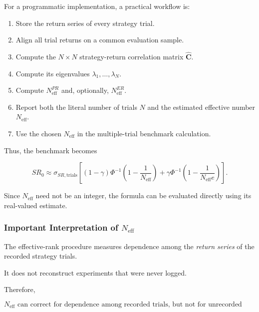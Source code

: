 \documentclass[11pt,a4paper]{article}
\begin{document}
For a programmatic implementation, a practical workflow is:

\begin{enumerate}
    \item Store the return series of every strategy trial.
    
    \item Align all trial returns on a common evaluation sample.
    
    \item Compute the $N\times N$ strategy-return correlation matrix
    $\widehat{\mathbf{C}}$.
    
    \item Compute its eigenvalues
    $\lambda_1,\ldots,\lambda_N$.
    
    \item Compute
    $N_{\mathrm{eff}}^{PR}$ and, optionally,
    $N_{\mathrm{eff}}^{ER}$.
    
    \item Report both the literal number of trials $N$ and the estimated
    effective number $N_{\mathrm{eff}}$.
    
    \item Use the chosen $N_{\mathrm{eff}}$ in the multiple-trial benchmark
    calculation.
\end{enumerate}

Thus, the benchmark becomes

\begin{equation}
\boxed{
SR_0
\approx
\sigma_{SR,\mathrm{trials}}
\left[
(1-\gamma)
\Phi^{-1}
\left(
1-\frac{1}{N_{\mathrm{eff}}}
\right)
+
\gamma
\Phi^{-1}
\left(
1-\frac{1}{N_{\mathrm{eff}}e}
\right)
\right].
}
\end{equation}

Since $N_{\mathrm{eff}}$ need not be an integer, the formula can be evaluated
directly using its real-valued estimate.


\subsubsection{Important Interpretation of $N_{\mathrm{eff}}$}

The effective-rank procedure measures dependence among the \emph{return series}
of the recorded strategy trials.

It does not reconstruct experiments that were never logged.

Therefore,

\begin{equation}
\boxed{
N_{\mathrm{eff}}
\text{ can correct for dependence among recorded trials, but not for
unrecorded research decisions.}
}
\end{equation}
\end{document}
